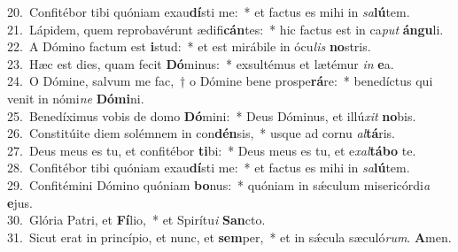 {20.~}Confitébor tibi quóniam exau\textbf{dí}sti me:~* et factus es mihi in \textit{sa}\textbf{lú}tem.\\
{21.~}Lápidem, quem reprobavérunt ædifi\textbf{cán}tes:~* hic factus est in ca\textit{put} \textbf{án}\textbf{gu}li.\\
{22.~}A Dómino factum est \textbf{i}stud:~* et est mirábile in ócu\textit{lis} \textbf{no}stris.\\
{23.~}Hæc est dies, quam fecit \textbf{Dó}minus:~* exsultémus et lætémur \textit{in} \textbf{e}a.\\
{24.~}O Dómine, salvum me fac,~† o Dómine bene prospe\textbf{rá}re:~* benedíctus qui venit in nómi\textit{ne} \textbf{Dó}\textbf{mi}ni.\\
{25.~}Benedíximus vobis de domo \textbf{Dó}mini:~* Deus Dóminus, et illú\textit{xit} \textbf{no}bis.\\
{26.~}Constitúite diem solémnem in con\textbf{dén}sis,~* usque ad cornu \textit{al}\textbf{tá}ris.\\
{27.~}Deus meus es tu, et confitébor \textbf{ti}bi:~* Deus meus es tu, et e\textit{xal}\textbf{tá}\textbf{bo} te.\\
{28.~}Confitébor tibi quóniam exau\textbf{dí}sti me:~* et factus es mihi in \textit{sa}\textbf{lú}tem.\\
{29.~}Confitémini Dómino quóniam \textbf{bo}nus:~* quóniam in sǽculum misericórdi\textit{a} \textbf{e}jus.\\
{30.~}Glória Patri, et \textbf{Fí}lio,~* et Spirítu\textit{i} \textbf{San}cto.\\
{31.~}Sicut erat in princípio, et nunc, et \textbf{sem}per,~* et in sǽcula sæculó\textit{rum}. \textbf{A}men.\\
